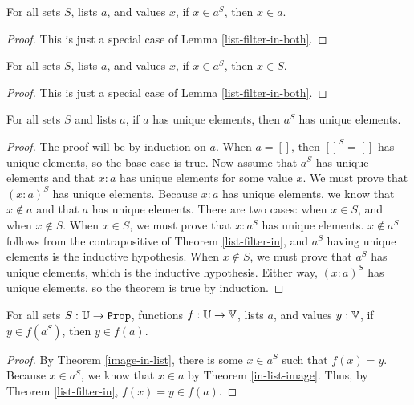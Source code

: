 \documentclass[../math.tex]{subfiles}
\begin{document}
\begin{theorem} \label{list-filter-in}
    For all sets $S$, lists $a$, and values $x$, if $x \in a^S$, then $x \in a$.
\end{theorem}
\begin{proof}
    This is just a special case of Lemma \ref{list-filter-in-both}.
\end{proof}

\begin{theorem} \label{list-filter-in-set}
    For all sets $S$, lists $a$, and values $x$, if $x \in a^S$, then $x \in S$.
\end{theorem}
\begin{proof}
    This is just a special case of Lemma \ref{list-filter-in-both}.
\end{proof}

\begin{theorem} \label{list-filter-unique}
    For all sets $S$ and lists $a$, if $a$ has unique elements, then $a^S$ has
    unique elements.
\end{theorem}
\begin{proof}
    The proof will be by induction on $a$.  When $a = []$, then $[]^S = []$ has
    unique elements, so the base case is true.  Now assume that $a^S$ has unique
    elements and that $x : a$ has unique elements for some value $x$.  We must
    prove that $(x : a)^S$ has unique elements.  Because $x : a$ has unique
    elements, we know that $x \notin a$ and that $a$ has unique elements.  There
    are two cases: when $x \in S$, and when $x \notin S$.  When $x \in S$, we
    must prove that $x : a^S$ has unique elements.  $x \notin a^S$ follows from
    the contrapositive of Theorem \ref{list-filter-in}, and $a^S$ having unique
    elements is the inductive hypothesis.  When $x \notin S$, we must prove that
    $a^S$ has unique elements, which is the inductive hypothesis.  Either way,
    $(x : a)^S$ has unique elements, so the theorem is true by induction.
\end{proof}

\begin{theorem} \label{list-filter-image-in}
    For all sets $S : \set{\U}$, functions $f : \mathbb{U} \to \mathbb{V}$, lists $a$, and
    values $y : \mathbb{V}$, if $y \in f(a^S)$, then $y \in f(a)$.
\end{theorem}
\begin{proof}
    By Theorem \ref{image-in-list}, there is some $x \in a^S$ such that $f(x) =
    y$.  Because $x \in a^S$, we know that $x \in a$ by Theorem
    \ref{in-list-image}.  Thus, by Theorem \ref{list-filter-in}, $f(x) = y \in
    f(a)$.
\end{proof}
\end{document}
